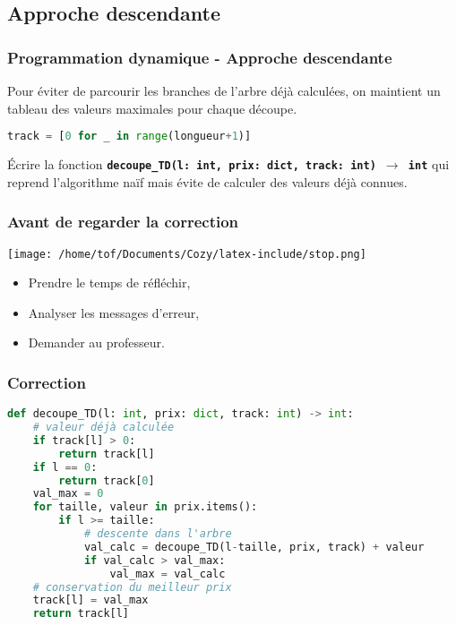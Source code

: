 \documentclass[svgnames,11pt]{beamer}
\begin{document}
\subsection{Approche descendante}
\begin{frame}[fragile]
    \frametitle{Programmation dynamique - Approche descendante}

Pour éviter de parcourir les branches de l'arbre déjà calculées, on maintient un tableau des valeurs maximales pour chaque découpe.
\begin{center}
\begin{lstlisting}[language=Python , basicstyle=\ttfamily\small, xleftmargin=2em, xrightmargin=2em]
track = [0 for _ in range(longueur+1)]
\end{lstlisting}
\end{center}
\begin{activite}
Écrire la fonction \textbf{\texttt{decoupe\_TD(l: int, prix: dict, track: int) $\rightarrow$ int}} qui reprend l'algorithme naïf mais évite de calculer des valeurs déjà connues.
\end{activite}

\end{frame}
\begin{frame}
    \frametitle{Avant de regarder la correction}
\begin{center}
    \centering
    \texttt{[image: /home/tof/Documents/Cozy/latex-include/stop.png]}
    \end{center}
{\Large
    \begin{itemize}
        \item Prendre le temps de réfléchir,
        \item Analyser les messages d'erreur,
        \item Demander au professeur.
    \end{itemize}
}
\end{frame}
\begin{frame}[fragile]
    \frametitle{Correction}
\begin{center}
\begin{lstlisting}[language=Python , basicstyle=\ttfamily\small, xleftmargin=0.2em, xrightmargin=-2em]
def decoupe_TD(l: int, prix: dict, track: int) -> int:
    # valeur déjà calculée
    if track[l] > 0:
        return track[l]
    if l == 0:
        return track[0]
    val_max = 0
    for taille, valeur in prix.items():
        if l >= taille:
            # descente dans l'arbre
            val_calc = decoupe_TD(l-taille, prix, track) + valeur
            if val_calc > val_max:
                val_max = val_calc
    # conservation du meilleur prix
    track[l] = val_max
    return track[l]
\end{lstlisting}
\end{center} 

\end{frame}
\end{document}
